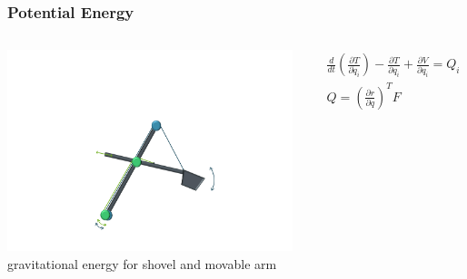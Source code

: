 
\begin{frame}
	\frametitle{Potential Energy}
	\begin{columns}
		\centering
		\includegraphics[trim=30cm 5cm 30cm 23cm, clip=true, width=\linewidth]{img/Excavator_Only}
		gravitational energy for shovel and movable arm\\
		\onslide<2->
		\begin{small}
		\begin{align*}
			&\frac{d}{dt}\left(\frac{\partial T}{\partial \dot{q}_i}\right) -
			\frac{\partial T}{\partial q_i} +
			\frac{\partial V}{\partial q_i}
			= Q_i \\
			& Q = \left(\frac{\partial r}{\partial q}\right)^T F\\
		\end{align*}
	    \end{small}
	\end{columns}
\end{frame}


